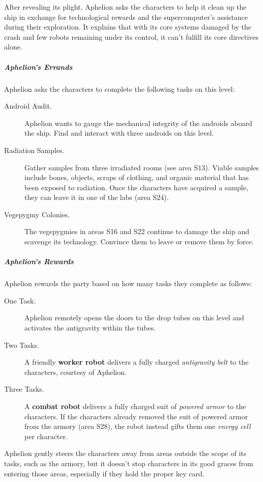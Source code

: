 \documentclass[10pt,a4paper,twoside,bg=print,twocolumn,openany,nodeprecatedcode]{dndbook}
\begin{document}
After revealing its plight, Aphelion asks the characters to help it clean up the ship in exchange for technological rewards and the supercomputer's assistance during their exploration. It explains that with its core systems damaged by the crash and few robots remaining under its control, it can't fulfill its core directives alone.

\subparagraph{Aphelion's Errands}
Aphelion asks the characters to complete the following tasks on this level:


\begin{description}
\item[Android Audit.]
Aphelion wants to gauge the mechanical integrity of the androids aboard the ship. Find and interact with three androids on this level.
\item[Radiation Samples.]
Gather samples from three irradiated rooms (see area S13). Viable samples include bones, objects, scraps of clothing, and organic material that has been exposed to radiation. Once the characters have acquired a sample, they can leave it in one of the labs (area S24).
\item[Vegepygmy Colonies.]
The vegepygmies in areas S16 and S22 continue to damage the ship and scavenge its technology. Convince them to leave or remove them by force.
\end{description}

\subparagraph{Aphelion's Rewards}
Aphelion rewards the party based on how many tasks they complete as follows:


\begin{description}
\item[One Task.]
Aphelion remotely opens the doors to the drop tubes on this level and activates the antigravity within the tubes.
\item[Two Tasks.]
A friendly \textbf{worker robot} delivers a fully charged \textit{antigravity belt} to the characters, courtesy of Aphelion.
\item[Three Tasks.]
A \textbf{combat robot} delivers a fully charged suit of \textit{powered armor} to the characters. If the characters already removed the suit of powered armor from the armory (area S28), the robot instead gifts them one \textit{energy cell} per character.
\end{description}

Aphelion gently steers the characters away from areas outside the scope of its tasks, such as the armory, but it doesn't stop characters in its good graces from entering those areas, especially if they hold the proper key card.
\end{document}
